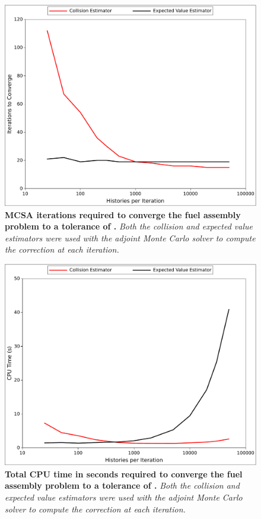 \begin{figure}[t!]
  \begin{center}
    \includegraphics[width=6in]{chapters/spn_equations/estimator_iters.pdf}
  \end{center}
  \caption{\textbf{MCSA iterations required to converge the fuel
      assembly problem to a tolerance of .} \textit{Both the
      collision and expected value estimators were used with the
      adjoint Monte Carlo solver to compute the correction at each
      iteration.}}
  \label{fig:spn_estimator_iters}
\end{figure}

\begin{figure}[t!]
  \begin{center}
    \includegraphics[width=6in]{chapters/spn_equations/estimator_time.pdf}
  \end{center}
  \caption{\textbf{Total CPU time in seconds required to converge the
      fuel assembly problem to a tolerance of .}
    \textit{Both the collision and expected value estimators were used
      with the adjoint Monte Carlo solver to compute the correction at
      each iteration.}}
  \label{fig:spn_estimator_time}
\end{figure}

